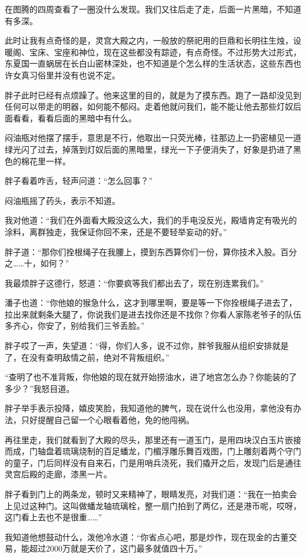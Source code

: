 在图腾的四周查看了一圈没什么发现。我们又往后走了走，后面一片黑暗，不知道有多深。

此时让我有点奇怪的是，灵宫大殿之内，一般放的祭祀用的巨鼎和长明往生烛，设暖阁、宝床、宝座和神位，现在这些都没有踪迹，有点奇怪。不过形势大过形式，东夏国一直蜗居在长白山密林深处，也不知道是个怎么样的生活状态，这些东西也许女真习俗里并没有也说不定。

胖子此时已经有点烦躁了。他来这里的目的，就是为了摸东西。跑了一路却没见到任何可以带走的明器，如何能不郁闷。走着他就问我们，能不能让他去那些灯奴后面看看，看看后面的黑暗中有什么。

闷油瓶对他摆了摆手，意思是不行，他取出一只荧光棒，往那边上一扔密植见一道绿光闪了过去，掉落到灯奴后面的黑暗里，绿光一下子便消失了，好象是扔进了黑色的棉花里一样。

胖子看着咋舌，轻声问道：“怎么回事？”

闷油瓶摇了药头，表示不知道。

我对他道：“我们在外面看大殿没这么大，我们的手电没反光，殿墙肯定有吸光的涂料，离群独走，我保证你回不来，还是不要轻举妄动的好。”

胖子道：“那你们拴根绳子在我腰上，摸到东西算你们一份，算你技术入股。百分之……十，如何？”

我最烦胖子这德行，怒道：“你要疯等我们都出去了，现在别连累我们。”

潘子也道：“你他娘的猴急什么，这才到哪里啊，要是等一下你拴根绳子进去了，拉出来就剩条大腿了，你说我们是进去找你还是不找你？你看人家陈老爷子的队伍多齐心，你安了，别给我们三爷丢脸。”

胖子哎了一声，失望道：“得，你们人多，说不过你，胖爷我服从组织安排就是了，在没有查明敌情之前，绝对不背叛组织。”

“查明了也不准背叛，你他娘的现在就开始捞油水，进了地宫怎么办？你能装的了多少？”我怒目道。

胖子举手表示投降，嬉皮笑脸，我知道他的脾气，现在说什么也没用，拿他没有办法，只好提醒自己留一个心眼看着他，免的他闯祸。

再往里走，我们就看到了大殿的尽头，那里还有一道玉门，是用四块汉白玉片嵌接而成，门轴盘着琉璃烧制的百足蟠龙，门楣浮雕乐舞百戏图，门上雕刻着两个守门的童子，门后同样没有自来石，门是用哨兵浇死，我们撬开之后，发现门后是通往灵宫后殿的走廊，漆黑一片。

胖子看到门上的两条龙，顿时又来精神了，眼睛发亮，对我们道：“我在一拍卖会上见过这种门。这叫做蟠龙轴琉璃栓，整一扇门拍到了两亿，还是港币呢，哎呀，这门看上去也不是很重……”

我知道他想鼓动什么，泼他冷水道：“你省点心吧，那是炒作，现在现金的古董交易，能超过2000万就是天价了，这门最多就值四十万。”

